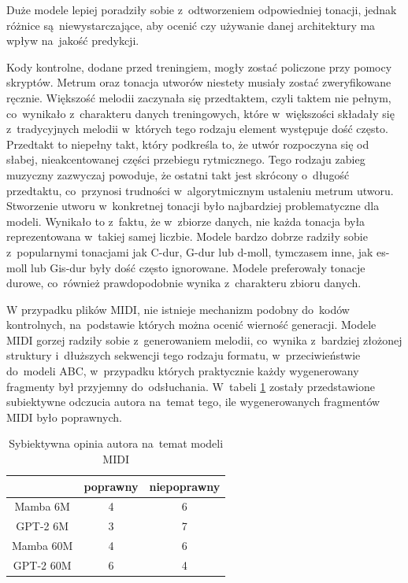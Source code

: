 \documentclass[data-science]{agh-wi} %
\begin{document}
Duże modele lepiej poradziły sobie z~odtworzeniem odpowiedniej tonacji, jednak różnice są~niewystarczające, aby ocenić czy używanie danej architektury ma wpływ na~jakość predykcji.

Kody kontrolne, dodane przed treningiem, mogły zostać policzone przy pomocy skryptów. Metrum oraz tonacja utworów niestety musiały zostać zweryfikowane ręcznie. Większość melodii zaczynała się przedtaktem, czyli taktem nie pełnym, co~wynikało z~charakteru danych treningowych, które w~większości składały się z~tradycyjnych melodii w~których tego rodzaju element występuje dość często. Przedtakt to niepełny takt, który podkreśla to, że utwór rozpoczyna się od słabej, nieakcentowanej części przebiegu rytmicznego. Tego rodzaju zabieg muzyczny zazwyczaj powoduje, że ostatni takt jest skrócony o~długość przedtaktu, co~przynosi trudności w~algorytmicznym ustaleniu metrum utworu. Stworzenie utworu w~konkretnej tonacji było najbardziej problematyczne dla modeli. Wynikało to z~faktu, że w~zbiorze danych, nie każda tonacja była reprezentowana w~takiej samej liczbie. Modele bardzo dobrze radziły sobie z~popularnymi tonacjami jak C-dur, G-dur lub d-moll, tymczasem inne, jak es-moll lub Gis-dur były dość często ignorowane. Modele preferowały tonacje durowe, co~również prawdopodobnie wynika z~charakteru zbioru danych.

W przypadku plików MIDI, nie istnieje mechanizm podobny do~kodów kontrolnych, na~podstawie których można ocenić wierność generacji. Modele MIDI gorzej radziły sobie z~generowaniem melodii, co~wynika z~bardziej złożonej struktury i~dłuższych sekwencji tego rodzaju formatu, w~przeciwieństwie do~modeli ABC, w~przypadku których praktycznie każdy wygenerowany fragmenty był przyjemny do~odsłuchania. W~tabeli \ref*{tab:midi_gen} zostały przedstawione subiektywne odczucia autora na~temat tego, ile wygenerowanych fragmentów MIDI było poprawnych.

\begin{table}[ht!]
    \centering
    \begin{tabular}{|c|c|c|}
    \hline
              & poprawny & niepoprawny \\ \hline
    Mamba 6M  & 4        & 6           \\ \hline
    GPT-2 6M  & 3        & 7           \\ \hline
    Mamba 60M & 4        & 6           \\ \hline
    GPT-2 60M & 6        & 4           \\ \hline
    \end{tabular}
    \caption{Sybiektywna opinia autora na~temat modeli MIDI}\label{tab:midi_gen}
\end{table}
\end{document}
